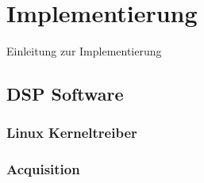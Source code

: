 \chapter{Implementierung}
Einleitung zur Implementierung

\section{DSP Software}

\subsection{Linux Kerneltreiber}\label{Kerneltreiber}


\subsection{Acquisition}


